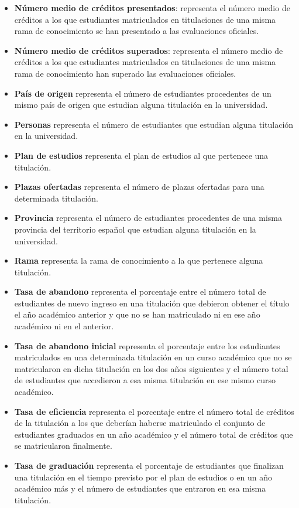 \begin{itemize}
	\item \textbf{Número medio de créditos presentados}: representa el número medio de créditos a los que estudiantes matriculados en titulaciones de una misma rama de conocimiento se han presentado a las evaluaciones oficiales.
	\item \textbf{Número medio de créditos superados}: representa el número medio de créditos a los que estudiantes matriculados en titulaciones de una misma rama de conocimiento han superado las evaluaciones oficiales.
	\item \textbf{País de origen} representa el número de estudiantes procedentes de un mismo país de origen que estudian alguna titulación en la universidad.
	\item \textbf{Personas} representa el número de estudiantes que estudian alguna titulación en la universidad.
	\item \textbf{Plan de estudios} representa el plan de estudios al que pertenece una titulación.
	\item \textbf{Plazas ofertadas} representa el número de plazas ofertadas para una determinada titulación.
	\item \textbf{Provincia} representa el número de estudiantes procedentes de una misma provincia del territorio español que estudian alguna titulación en la universidad.
	\item \textbf{Rama} representa la rama de conocimiento a la que pertenece alguna titulación.
	\item \textbf{Tasa de abandono} representa el porcentaje entre el número total de estudiantes de nuevo ingreso en una titulación que debieron obtener el título el año académico anterior y que no se han matriculado ni en ese año académico ni en el anterior.
	\item \textbf{Tasa de abandono inicial} representa el porcentaje entre los estudiantes matriculados en una determinada titulación en un curso académico que no se matricularon en dicha titulación en los dos años siguientes y el número total de estudiantes que accedieron a esa misma titulación en ese mismo curso académico.
	\item \textbf{Tasa de eficiencia} representa el porcentaje entre el número total de créditos de la titulación a los que deberían haberse matriculado el conjunto de estudiantes graduados en un año académico y el número total de créditos que se matricularon finalmente.
	\item \textbf{Tasa de graduación} representa el porcentaje de estudiantes que finalizan una titulación en el tiempo previsto por el plan de estudios o en un año académico más y el número de estudiantes que entraron en esa misma titulación.

\end{itemize}
